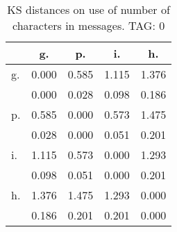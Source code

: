 \begin{table}[h!]
\begin{center}
\begin{tabular}{| l | c | c | c | c |}\hline
 & g. & p. & i. & h. \\\hline
g. & 0.000  & 0.585  & 1.115  & 1.376 \\\hline
 & 0.000  & 0.028  & 0.098  & 0.186 \\\hline
p. & 0.585  & 0.000  & 0.573  & 1.475 \\\hline
 & 0.028  & 0.000  & 0.051  & 0.201 \\\hline
i. & 1.115  & 0.573  & 0.000  & 1.293 \\\hline
 & 0.098  & 0.051  & 0.000  & 0.201 \\\hline
h. & 1.376  & 1.475  & 1.293  & 0.000 \\\hline
 & 0.186  & 0.201  & 0.201  & 0.000 \\\hline
\end{tabular}
\caption{KS distances on use of number of characters in messages. TAG: 0}
\end{center}
\end{table}